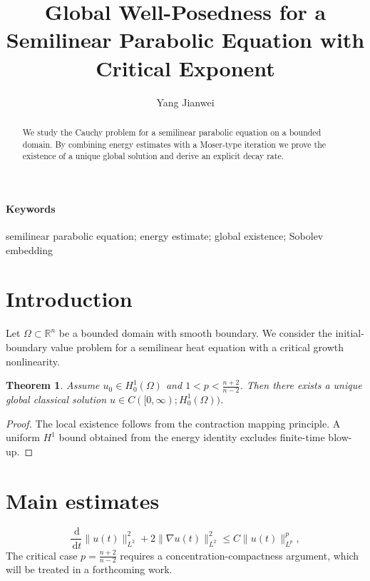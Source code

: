 \documentclass{aimsart}
\title{Global Well-Posedness for a Semilinear Parabolic Equation with Critical Exponent}
\author{Yang Jianwei}
\date{}
\def\YTfallback{1}
\newtheorem{theorem}{Theorem}[section]
\newcommand{\R}{\mathbb{R}}
\newcommand{\Om}{\Omega}
\newcommand{\dd}{\,\mathrm{d}}
\begin{document}
\maketitle
\ifdefined\YTfallback
\noindent{}
\bigskip
\fi
\begin{abstract}
We study the Cauchy problem for a semilinear parabolic equation on a bounded domain. By combining energy estimates with a Moser-type iteration we prove the existence of a unique global solution and derive an explicit decay rate.
\end{abstract}
\paragraph{Keywords} semilinear parabolic equation; energy estimate; global existence; Sobolev embedding

\section{Introduction}
Let $\Om\subset\R^n$ be a bounded domain with smooth boundary. We consider the initial-boundary value problem for a semilinear heat equation with a critical growth nonlinearity.

\begin{theorem}
Assume $u_0\in H^1_0(\Om)$ and $1<p<\frac{n+2}{n-2}$. Then there exists a unique global classical solution $u\in C([0,\infty);H^1_0(\Om))$.
\end{theorem}

\begin{proof}
The local existence follows from the contraction mapping principle. A uniform $H^1$ bound obtained from the energy identity excludes finite-time blow-up.
\end{proof}

\section{Main estimates}
\begin{equation}
\frac{\dd}{\dd t}\|u(t)\|_{L^2}^2+2\|\nabla u(t)\|_{L^2}^2 \le C\|u(t)\|_{L^p}^{p},
\end{equation}
The critical case $p=\frac{n+2}{n-2}$ requires a concentration-compactness argument, which will be treated in a forthcoming work.
\end{document}
